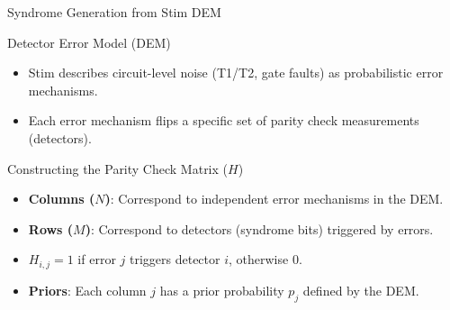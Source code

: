 \begin{frame}{Syndrome Generation from Stim DEM}
    \begin{block}{Detector Error Model (DEM)}
        \begin{itemize}
            \item Stim describes circuit-level noise (T1/T2, gate faults) as probabilistic error mechanisms.
            \item Each error mechanism flips a specific set of parity check measurements (detectors).
        \end{itemize}
    \end{block}
    
    \begin{block}{Constructing the Parity Check Matrix ($H$)}
        \begin{itemize}
            \item \textbf{Columns ($N$)}: Correspond to independent error mechanisms in the DEM.
            \item \textbf{Rows ($M$)}: Correspond to detectors (syndrome bits) triggered by errors.
            \item $H_{i,j} = 1$ if error $j$ triggers detector $i$, otherwise $0$.
            \item \textbf{Priors}: Each column $j$ has a prior probability $p_j$ defined by the DEM.
        \end{itemize}
    \end{block}
\end{frame}

